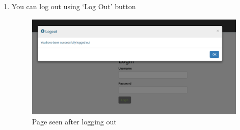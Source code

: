 \documentclass[a4paper,11pt,twoside]{report}
\theoremstyle{definition}
\begin{document}
\begin{enumerate}
\item You can log out using ‘Log Out’ button
\begin{figure}[h!]
\begin{center}
\includegraphics[width=\textwidth]{AS/login/3}
\end{center}
\caption{Page seen after logging out}
\end{figure}
\end{enumerate}
\end{document}
